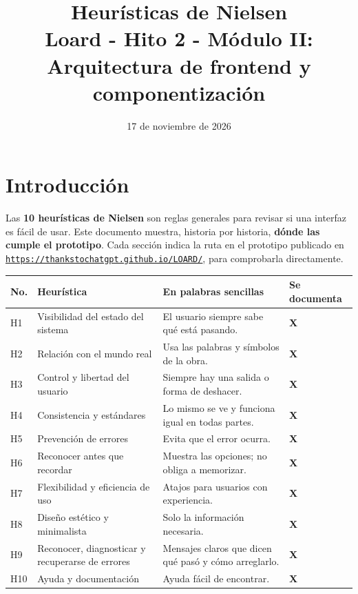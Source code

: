 \documentclass[11pt]{article}
\title{Heurísticas de Nielsen\\[0.3em]
\large Loard - Hito 2 - Módulo II: Arquitectura de frontend y componentización}
\author{}
\date{17 de noviembre de 2026}
\newcommand{\urlapp}{https://thankstochatgpt.github.io/LOARD}
\newcommand{\si}{\textcolor{green!45!black}{\textbf{X}}}
\begin{document}
\maketitle

\section{Introducción}

Las \textbf{10 heurísticas de Nielsen} son reglas generales para revisar si una interfaz es fácil de usar.
Este documento muestra, historia por historia, \textbf{dónde las cumple el prototipo}. Cada sección indica la ruta en el prototipo publicado en
\href{\urlapp/}{\nolinkurl{https://thankstochatgpt.github.io/LOARD/}}, para comprobarla directamente.


\begin{center}
\begin{tabular}{|>{\centering\arraybackslash}m{0.9cm}|>{\raggedright\arraybackslash}m{5.4cm}|>{\raggedright\arraybackslash}m{7.1cm}|>{\centering\arraybackslash}m{1.6cm}|}
\hline
\rowcolor{barra}
\textbf{No.} & \textbf{Heurística} & \textbf{En palabras sencillas} & \textbf{Se documenta} \\ \hline
H1 & Visibilidad del estado del sistema & El usuario siempre sabe qué está pasando. & \si \\ \hline
H2 & Relación con el mundo real & Usa las palabras y símbolos de la obra. & \si \\ \hline
H3 & Control y libertad del usuario & Siempre hay una salida o forma de deshacer. & \si \\ \hline
H4 & Consistencia y estándares & Lo mismo se ve y funciona igual en todas partes. & \si \\ \hline
H5 & Prevención de errores & Evita que el error ocurra. & \si \\ \hline
H6 & Reconocer antes que recordar & Muestra las opciones; no obliga a memorizar. & \si \\ \hline
H7 & Flexibilidad y eficiencia de uso & Atajos para usuarios con experiencia. & \si \\ \hline
H8 & Diseño estético y minimalista & Solo la información necesaria. & \si \\ \hline
H9 & Reconocer, diagnosticar y recuperarse de errores & Mensajes claros que dicen qué pasó y cómo arreglarlo. & \si \\ \hline
H10 & Ayuda y documentación & Ayuda fácil de encontrar. & \si \\ \hline
\end{tabular}
\end{center}
\end{document}
